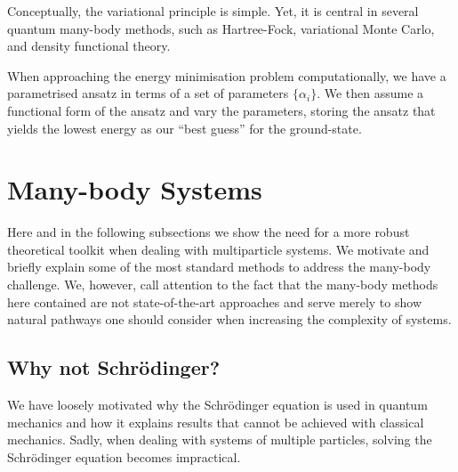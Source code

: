 Conceptually, the variational principle is simple. Yet, it is central in several quantum many-body methods, such as Hartree-Fock, variational Monte Carlo, and density functional theory.

\begin{JTD}
When approaching the energy minimisation problem computationally, we have a parametrised ansatz in terms of a set of parameters $\{\alpha_i\}$. We then assume a functional form of the ansatz and vary the parameters, storing the ansatz that yields the lowest energy as our ``best guess'' for the ground-state.
\end{JTD}


\section{Many-body Systems}\label{sec:many-body}
Here and in the following subsections we show the need for a more robust theoretical toolkit when dealing with multiparticle systems. We motivate and briefly explain some of the most standard methods to address the many-body challenge. We, however, call attention to the fact that the many-body methods here contained are not state-of-the-art approaches and serve merely to show natural pathways one should consider when increasing the complexity of systems.

\subsection{Why not Schrödinger?}

We have loosely motivated why the Schrödinger equation is used in quantum mechanics and how it explains results that cannot be achieved with classical mechanics. Sadly, when dealing with systems of multiple particles, solving the Schrödinger equation becomes impractical.

